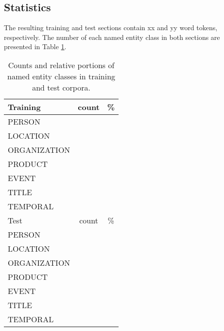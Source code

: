 \documentclass[11pt]{article}
\begin{document}


\subsection{Statistics}

The resulting training and test sections contain xx and yy word tokens, respectively. The number of each named entity class in both sections are presented in Table \ref{tab: statistics}.


\begin{table}[h!]
\begin{center}
\begin{tabular}{lcc} 
\hline
\noalign{\smallskip}
Training & count & \% \\ 
\hline
\noalign{\smallskip}
PERSON & \\
LOCATION & \\
ORGANIZATION & \\
PRODUCT & \\
EVENT & \\
TITLE & \\
TEMPORAL & \\
\hline
\noalign{\smallskip}
Test & count & \% \\ 
\hline
\noalign{\smallskip}
PERSON & \\
LOCATION & \\
ORGANIZATION & \\
PRODUCT & \\
EVENT & \\
TITLE & \\
TEMPORAL & \\
\end{tabular}
\end{center}
\caption{Counts and relative portions of named entity classes in training and test corpora.}
\label{tab: statistics} 
\end{table}



\end{document}
